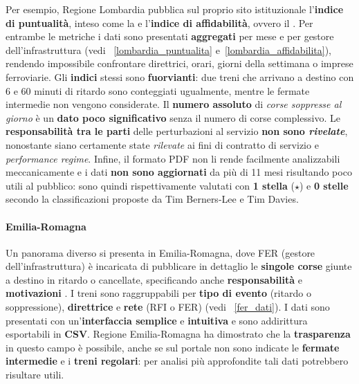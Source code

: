 \documentclass[12pt,a4paper,italian]{report}
\begin{document}
Per esempio, Regione Lombardia pubblica sul proprio sito istituzionale
\cite{LombardiaDati} l'\textbf{indice di puntualità}, inteso come la
 e
l'\textbf{indice di affidabilità}, ovvero il .  Per entrambe le metriche i
dati sono presentati \textbf{aggregati} per mese e per gestore
dell'infrastruttura (vedi \figurename~\ref{lombardia_puntualita}
e~\ref{lombardia_affidabilita}), rendendo impossibile confrontare
direttrici, orari, giorni della settimana o imprese ferroviarie.  Gli
\textbf{indici} stessi sono \textbf{fuorvianti}: due treni che
arrivano a destino con 6 e 60 minuti di ritardo sono conteggiati
ugualmente, mentre le fermate intermedie non vengono considerate.  Il
\textbf{numero assoluto} di \textit{corse soppresse al giorno} è un
\textbf{dato poco significativo} senza il numero di corse complessivo.
Le \textbf{responsabilità tra le parti} delle perturbazioni al
servizio \textbf{non sono \textit{rivelate}}, nonostante siano
certamente state \textit{rilevate} ai fini di contratto di servizio e
\textit{performance regime}.  Infine, il formato PDF non li rende
facilmente analizzabili meccanicamente e i dati \textbf{non sono
    aggiornati} da più di 11 mesi risultando poco utili al pubblico:
sono quindi rispettivamente valutati con \textbf{1 stella} ($\star$) e
\textbf{0 stelle} secondo la classificazioni proposte da Tim
Berners-Lee e Tim Davies.

\paragraph{Emilia-Romagna}
Un panorama diverso si presenta in Emilia-Romagna, dove FER (gestore
dell'infrastruttura) è incaricata di pubblicare in dettaglio le
\textbf{singole corse} giunte a destino in ritardo o cancellate,
specificando anche \textbf{responsabilità} e \textbf{motivazioni}
\cite{FerDati}.  I treni sono raggruppabili per \textbf{tipo di
    evento} (ritardo o soppressione), \textbf{direttrice} e
\textbf{rete} (RFI o FER) (vedi \figurename~\ref{fer_dati}).  I dati
sono presentati con un'\textbf{interfaccia semplice} e
\textbf{intuitiva} e sono addirittura esportabili in \textbf{CSV}.
Regione Emilia-Romagna ha dimostrato che la \textbf{trasparenza} in
questo campo è possibile, anche se sul portale non sono indicate le
\textbf{fermate intermedie} e i \textbf{treni regolari}: per analisi
più approfondite tali dati potrebbero risultare utili.
\end{document}
